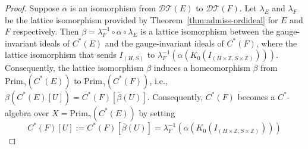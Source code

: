 \documentclass[12pt]{amsbook}%
\theoremstyle{defin}
\theoremstyle{remark}
\numberwithin{equation}{chapter}
\numberwithin{theor}{section}
\newcommand{\ZZ}{\mathbb{Z}}
\newcommand{\DT}{\mathcal{DT}}
\begin{document}
\begin{proof}
Suppose $\alpha$ is an isomorphism from $\DT(E)$ to $\DT(F)$.  Let $\lambda_E$ and $\lambda_F$ be the lattice isomorphism provided by Theorem~\ref{thm:admiss-ordideal} for $E$ and $F$ respectively.  Then $\beta = \lambda_F^{-1} \circ \alpha \circ \lambda_E$ is a lattice isomorphism between the gauge-invariant ideals of $C^*(E)$ and the gauge-invariant ideals of $C^*(F)$, where the lattice isomorphism that sends $I_{(H, S)}$ to $\lambda_F^{-1} ( \alpha(K_0( I_{ ( H \times \ZZ, S \times \ZZ) } ) ))$.  Consequently, the lattice isomorphism $\beta$ induces a homeomorphism $\overline{\beta}$ from $\mathrm{Prim}_{\gamma}( C^*(E))$ to $\mathrm{Prim}_{\gamma}( C^*(F))$, i.e., $\beta ( C^*(E)[U] ) = C^*(F)[ \overline{\beta}(U)]$.  Consequently, $C^*(F)$ becomes a $C^*$-algebra over $X = \mathrm{Prim}_\gamma ( C^*(E))$ by setting 
\[
C^*(F)[U] := C^*(F)[\overline{\beta}(U)] = \lambda_F^{-1} ( \alpha(K_0( I_{ ( H \times \ZZ, S \times \ZZ) } ) ))
\]   


\end{proof}
\end{document}
